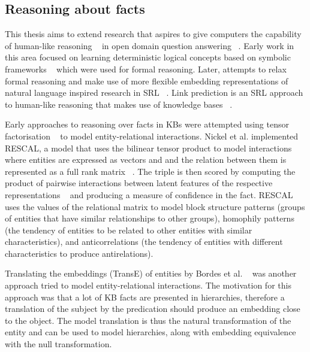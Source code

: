 \subsection{Reasoning about facts} 

\noindent This thesis aims to extend research that aspires to give computers the capability of human-like reasoning \unskip~\citep{bordes2011learning} in open domain question answering \unskip~\citep{hakimov2019evaluating}. Early work in this area focused on learning deterministic logical concepts based on symbolic frameworks \unskip~\citep{hohenecker2017deep} which were used for formal reasoning. Later, attempts to relax formal reasoning and make use of more flexible embedding representations of natural language inspired research in SRL \unskip~\citep{koller2007introduction}. Link prediction is an SRL approach to human-like reasoning that makes use of knowledge bases \unskip~\citep{balazevic2019hypernetwork, dettmers2018convolutional, socher2013reasoning}. \par

\noindent Early approaches to reasoning over facts in KBs were attempted using tensor factorisation \unskip~\citep{nickel2011three} to model entity-relational interactions. Nickel et al. implemented RESCAL, a model that uses the bilinear tensor product to model interactions where entities are expressed as vectors and and the relation between them is represented as a full rank matrix \unskip~\citep{nickel2012factorizing}. The triple is then scored by computing the product of pairwise interactions between latent features of the respective representations \unskip~\citep{nickel2015review} and producing a measure of confidence in the fact. RESCAL uses the values of the relational matrix to model block structure patterns (groups of entities that have similar relationships to other groups), homophily patterns (the tendency of entities to be related to other entities with similar characteristics), and anticorrelations (the tendency of entities with different characteristics to produce antirelations). \par

\noindent Translating the embeddings (TransE) of entities by Bordes et al. \unskip~\citep{bordes2013translating} was another approach tried to model entity-relational interactions. The motivation for this approach was that a lot of KB facts are presented in hierarchies, therefore a translation of the subject by the predication should produce an embedding close to the object. The model translation is thus the natural transformation of the entity and can be used to model hierarchies, along with embedding equivalence with the null transformation. \par

